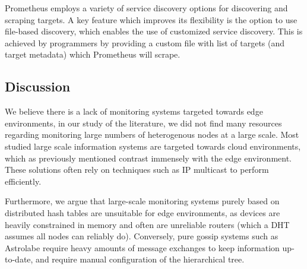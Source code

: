 Prometheus employs a variety of service discovery options for discovering and scraping targets. A key feature which improves its flexibility is the option to use file-based discovery, which enables the use of customized service discovery. This is achieved by programmers by providing a custom file with list of targets (and target metadata) which Prometheus will scrape.

\subsection{Discussion}

We believe there is a lack of monitoring systems targeted towards edge environments, in our study of the literature, we did not find many resources regarding monitoring large numbers of heterogenous nodes at a large scale. Most studied large scale information systems are targeted towards cloud environments, which as previously mentioned contrast immensely with the edge environment. These solutions often rely on techniques such as IP multicast \cite{massie2004ganglia} to perform efficiently.

Furthermore, we argue that large-scale monitoring systems purely based on distributed hash tables \cite{SDIMS} are unsuitable for edge environments, as  devices are heavily constrained in memory and often are unreliable routers (which a DHT assumes all nodes can reliably do). Conversely, pure gossip systems such as Astrolabe \cite{Renesse2003} require heavy amounts of message exchanges to keep information up-to-date, and require manual configuration of the hierarchical tree. 







    
    
